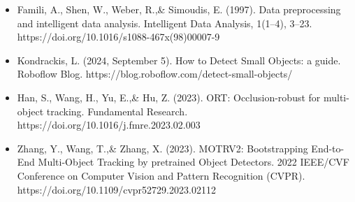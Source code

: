 \documentclass[11pt]{article}
\begin{document}
\begin{itemize}
    \item Famili, A., Shen, W., Weber, R.,\& Simoudis, E. (1997). Data preprocessing and intelligent data analysis. Intelligent Data Analysis, 1(1–4), 3–23. https://doi.org/10.1016/s1088-467x(98)00007-9
    \item Kondrackis, L. (2024, September 5). How to Detect Small Objects: a guide. Roboflow Blog. https://blog.roboflow.com/detect-small-objects/
    \item Han, S., Wang, H., Yu, E.,\& Hu, Z. (2023). ORT: Occlusion-robust for multi-object tracking. Fundamental Research. https://doi.org/10.1016/j.fmre.2023.02.003
    \item Zhang, Y., Wang, T.,\& Zhang, X. (2023). MOTRV2: Bootstrapping End-to-End Multi-Object Tracking by pretrained Object Detectors. 2022 IEEE/CVF Conference on Computer Vision and Pattern Recognition (CVPR). https://doi.org/10.1109/cvpr52729.2023.02112
\end{itemize}
\end{document}
